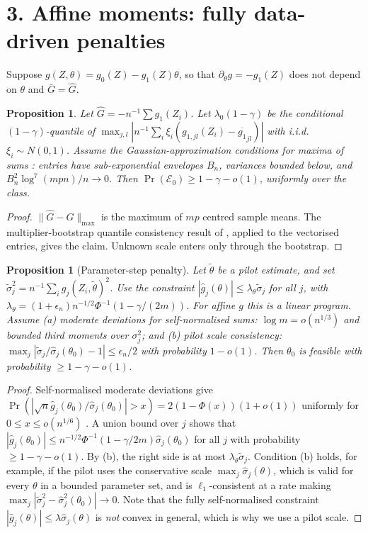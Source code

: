 \documentclass[11pt]{article}
\newtheorem{proposition}[theorem]{Proposition}
\theoremstyle{definition}
\begin{document}
\section*{3. Affine moments: fully data-driven penalties}
Suppose $g(Z,\theta)=g_0(Z)-g_1(Z)\theta$, so that $\partial_\theta g=-g_1(Z)$ does not depend on $\theta$ and $\bar G=\widehat G$.
\begin{proposition}\label{prop:boot}
Let $\widehat G=-n^{-1}\sum g_1(Z_i)$. Let $\lambda_0(1-\gamma)$ be the conditional $(1-\gamma)$-quantile of
$\max_{j,l}|n^{-1}\sum_i\xi_i(g_{1,jl}(Z_i)-\overline{g_1}_{jl})|$ with i.i.d.\ $\xi_i\sim N(0,1)$. Assume the
Gaussian-approximation conditions for maxima of sums \cite{cck}: entries have sub-exponential envelopes $B_n$, variances
bounded below, and $B_n^2\log^7(mpn)/n\to0$. Then $\Pr(\mathcal E_0)\ge1-\gamma-o(1)$, uniformly over the class.
\end{proposition}
\begin{proof}
$\|\widehat G-G\|_{\max}$ is the maximum of $mp$ centred sample means. The multiplier-bootstrap quantile consistency result of
\cite{cck}, applied to the vectorised entries, gives the claim. Unknown scale enters only through the bootstrap.
\end{proof}

\begin{proposition}[Parameter-step penalty]\label{prop:theta}
Let $\widetilde\theta$ be a pilot estimate, and set $\widetilde\sigma_j^2=n^{-1}\sum_ig_j(Z_i,\widetilde\theta)^2$. Use the
constraint $|\widehat g_j(\theta)|\le\lambda_\theta\widetilde\sigma_j$ for all $j$, with
$\lambda_\theta=(1+\epsilon_n)n^{-1/2}\Phi^{-1}(1-\gamma/(2m))$. For affine $g$ this is a linear program. Assume
(a) moderate deviations for self-normalised sums: $\log m=o(n^{1/3})$ and bounded third moments over $\sigma_j^2$; and
(b) pilot scale consistency: $\max_j|\widetilde\sigma_j/\widehat\sigma_j(\theta_0)-1|\le\epsilon_n/2$ with probability $1-o(1)$.
Then $\theta_0$ is feasible with probability $\ge1-\gamma-o(1)$.
\end{proposition}
\begin{proof}
Self-normalised moderate deviations give
$\Pr(|\sqrt n\widehat g_j(\theta_0)/\widehat\sigma_j(\theta_0)|>x)=2(1-\Phi(x))(1+o(1))$ uniformly for $0\le x\le o(n^{1/6})$
\cite{jsw}. A union bound over $j$ shows that $|\widehat g_j(\theta_0)|\le n^{-1/2}\Phi^{-1}(1-\gamma/2m)\widehat\sigma_j(\theta_0)$
for all $j$ with probability $\ge1-\gamma-o(1)$. By (b), the right side is at most $\lambda_\theta\widetilde\sigma_j$.
Condition (b) holds, for example, if the pilot uses the conservative scale $\max_j\widehat\sigma_j(\theta)$, which is valid for
every $\theta$ in a bounded parameter set, and is $\ell_1$-consistent at a rate making
$\max_j|\widetilde\sigma_j^2-\widehat\sigma_j^2(\theta_0)|\to0$. Note that the fully self-normalised constraint
$|\widehat g_j(\theta)|\le\lambda\widehat\sigma_j(\theta)$ is \emph{not} convex in general, which is why we use a pilot scale.
\end{proof}
\end{document}
